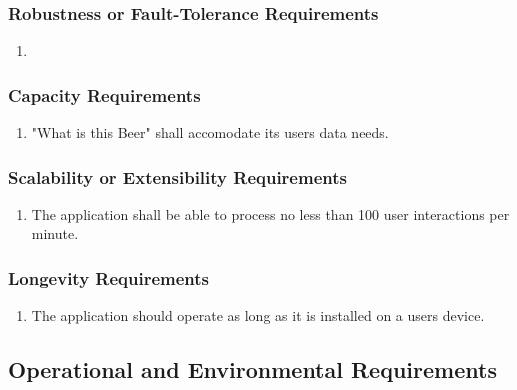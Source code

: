 \documentclass[]{article}
\begin{document}
\subsubsection{Robustness or Fault-Tolerance Requirements}
\label{ssub:robustness_or_fault_tolerance_requirements}
\begin{enumerate}[{PR}1. ]
	\item 
\end{enumerate}

\subsubsection{Capacity Requirements}
\label{ssub:capacity_requirements}
\begin{enumerate}[{PR}1. ]
	\item "What is this Beer" shall accomodate its users data needs.
\end{enumerate}

\subsubsection{Scalability or Extensibility Requirements}
\label{ssub:scalability_or_extensibility_requirements}
\begin{enumerate}[{PR}1. ]
	\item The application shall be able to process no less than 100 user interactions per minute.
\end{enumerate}

\subsubsection{Longevity Requirements}
\label{ssub:longevity_requirements}
\begin{enumerate}[{PR}1. ]
	\item The application should operate as long as it is installed on a users device.
\end{enumerate}


\subsection{Operational and Environmental Requirements}
\label{sub:operational_and_environmental_requirements}
\end{document}
